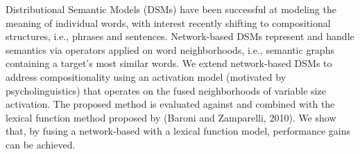 Distributional Semantic Models (DSMs) have been successful at modeling the meaning of individual words, with interest recently shifting to compositional structures, i.e., phrases and sentences. Network-based DSMs represent and handle semantics via operators applied on word neighborhoods, i.e., semantic graphs containing a target's most similar words. We extend network-based DSMs to address compositionality using an activation model (motivated by psycholinguistics) that operates on the fused neighborhoods of variable size activation. The proposed method is evaluated against and combined with the lexical function method proposed by (Baroni and Zamparelli, 2010). We show that, by fusing a network-based with a lexical function model, performance gains can be achieved.
